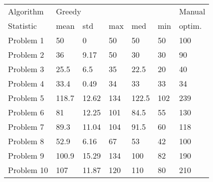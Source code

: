 \begin{tabular}{lllllll}
\toprule
Algorithm & \multicolumn{5}{l}{Greedy} & Manual \\
Statistic &   mean &    std &  max &    med &  min & optim. \\
\midrule
Problem 1  &     50 &      0 &   50 &     50 &   50 &    100 \\
Problem 2  &     36 &   9.17 &   50 &     30 &   30 &     90 \\
Problem 3  &   25.5 &    6.5 &   35 &   22.5 &   20 &     40 \\
Problem 4  &   33.4 &   0.49 &   34 &     33 &   33 &     34 \\
Problem 5  &  118.7 &  12.62 &  134 &  122.5 &  102 &    239 \\
Problem 6  &     81 &  12.25 &  101 &   84.5 &   55 &    130 \\
Problem 7  &   89.3 &  11.04 &  104 &   91.5 &   60 &    118 \\
Problem 8  &   52.9 &   6.16 &   67 &     53 &   42 &    100 \\
Problem 9  &  100.9 &  15.29 &  134 &    100 &   82 &    190 \\
Problem 10 &    107 &  11.87 &  120 &    110 &   80 &    210 \\
\bottomrule
\end{tabular}
